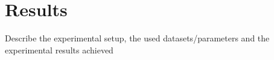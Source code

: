 \chapter{Results}\label{chap:results}


Describe the experimental setup, the used datasets/parameters and the experimental results achieved
